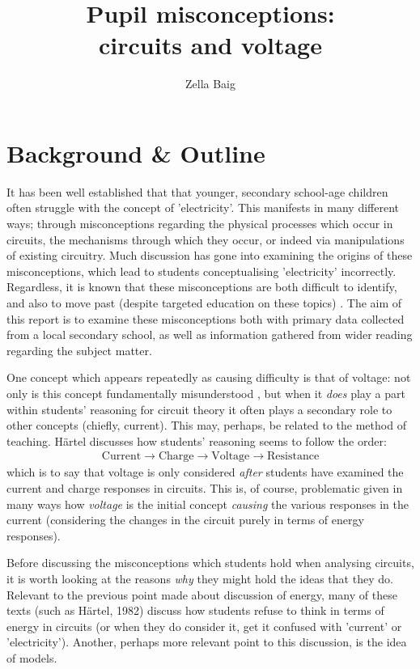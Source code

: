 \documentclass[a4paper,openany,nobib]{tufte-book}
\title{Pupil misconceptions:\\ \noindent circuits and voltage}
\author{Zella Baig}
\begin{document}
\frontmatter
{\maketitle}
\tableofcontents
\thispagestyle{empty}
\mainmatter
\chapter{Background \& Outline}
\setcounter{page}{1}
It has been well established that that younger, secondary school-age children often struggle with the concept of 'electricity'\autocite{psillos}.
This manifests in many different ways;
through misconceptions regarding the physical processes which occur in circuits, the mechanisms through which they occur, or indeed via manipulations of existing circuitry. Much discussion has gone into examining the origins of these misconceptions,
which lead to students conceptualising 'electricity' incorrectly.
Regardless, it is known that these misconceptions are both difficult to identify, and also to move past (despite targeted education on these topics)
\autocite{lee2001}. The aim of this report is to examine these misconceptions both with primary data collected from a local secondary school, as well as information gathered from wider reading regarding the subject matter.

One concept which appears repeatedly as causing difficulty is that of voltage: not only is this concept fundamentally {misunderstood \autocite{shipstone_children}}, but when it \emph{does} play a part within students' reasoning for circuit theory it often plays a secondary role to other concepts (chiefly, current).
This may, perhaps, be related to the method of teaching. 
Härtel discusses how students' reasoning seems to follow the {order\autocite{hartel82}}:
\begin{align*}
	\text{Current}\rightarrow \text{Charge} \rightarrow \text{Voltage} \rightarrow \text{Resistance}
\end{align*}
which is to say that voltage is only considered \emph{after} students have examined the current and charge responses in circuits. This is, of course, problematic given in many ways how \emph{voltage} is the initial concept \emph{causing} the various responses in the current (considering the changes in the circuit purely in terms of energy responses).

Before discussing the misconceptions which students hold when analysing circuits, it is worth looking at the reasons \emph{why} they might hold the ideas that they do.
Relevant to the previous point made about discussion of energy, many of these texts (such as Härtel, 1982) discuss how students refuse to think in terms of energy in circuits (or when they do consider it, get it confused with 'current' or 'electricity').
Another, perhaps more relevant point to this discussion, is the idea of models.
\end{document}
